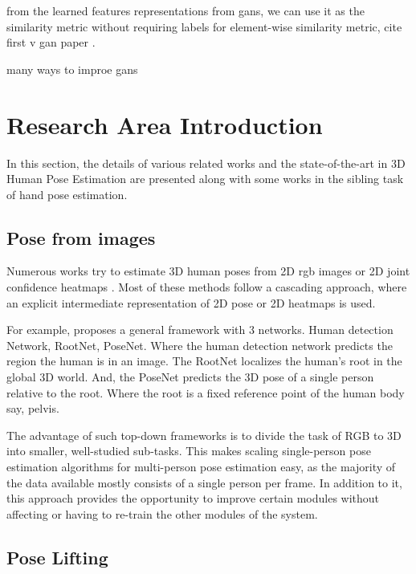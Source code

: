 from the learned features representations from \acp{gan}, we can use it as the similarity metric without requiring labels for element-wise similarity metric, cite first v gan paper \cite{autoencoding_beyond_pixels}.

many ways to improe gans \cite{openaigan2wgan}







\section{Research Area Introduction}
\label{sec:Research area introduction}

In this section, the details of various related works and the state-of-the-art in 3D Human Pose Estimation are presented along with some works in the sibling task of hand pose estimation.

\subsection{Pose from images}
Numerous works try to estimate 3D human poses from 2D \ac{rgb} images or 2D joint confidence heatmaps \cite{CameraDistanceAware, poselifter, DistillNRSfM, occlusionVideo}. Most of these methods follow a cascading approach, where an explicit intermediate representation of 2D pose or 2D heatmaps is used.

For example, \cite{CameraDistanceAware} proposes a general framework with 3 networks. Human detection Network, RootNet, PoseNet. Where the human detection network predicts the region the human is in an image. The RootNet localizes the human's root in the global 3D world. And, the PoseNet predicts the 3D pose of a single person relative to the root. Where the root is a fixed reference point of the human body say, pelvis.

The advantage of such top-down frameworks is to divide the task of RGB to 3D into smaller, well-studied sub-tasks. This makes scaling single-person pose estimation algorithms for multi-person pose estimation easy, as the majority of the data available mostly consists of a single person per frame. In addition to it, this approach provides the opportunity to improve certain modules without affecting or having to re-train the other modules of the system.

\subsection{Pose Lifting}

